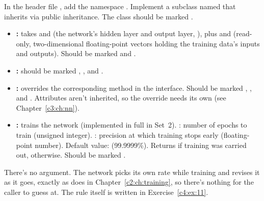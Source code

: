 \label{c4:ex:4}
In the header file , add the namespace
. Implement a subclass named  that inherits 
via public inheritance. The class should be marked .
\begin{itemize}
  \item \textbf{:} takes  and  (the network's
    hidden layer and output layer, ), plus  and
     (read-only, two-dimensional floating-point vectors holding the training
    data's inputs and outputs). Should be marked  and .
  \item \textbf{:} should be marked , , and
    .
  \item \textbf{:} overrides the corresponding method in the interface. Should be
    marked \code{[[nodiscard]]}, , and . Attributes aren't
    inherited, so the override needs its own \code{[[nodiscard]]} (see Chapter~\ref{c3:ch:nn}).
  \item \textbf{:} trains the network
    (implemented in full in Set~2). : number of epochs to train (unsigned
    integer). : precision at which training stops early (floating-point
    number). Default value:  (99.9999\%). Returns  if training was
    carried out,  otherwise. Should be marked .
\end{itemize}
There's no  argument. The network picks its own rate while training and revises
it as it goes, exactly as  does in Chapter~\ref{c2:ch:training}, so
there's nothing for the caller to guess at. The rule itself is written in
Exercise~\ref{c4:ex:11}.

